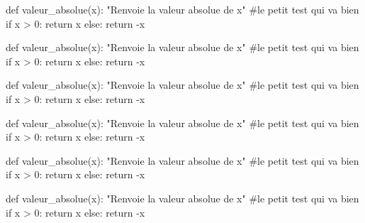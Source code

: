 \documentclass[french,a4paper,10pt]{article}
\begin{document}
\pagebreak

{\small \begin{codehigh}
\begin{CodePiton}[Style=Classique,Largeur=10cm,BarreTitre=false,Alignement=center]
def valeur_absolue(x):
    "Renvoie la valeur absolue de x"
    #le petit test qui va bien
    if x > 0:
        return x
    else:
    return -x
\end{CodePiton}
\end{codehigh}}

\begin{CodePiton}[Style=Classique,Largeur=10cm,BarreTitre=false,Alignement=center]
def valeur_absolue(x):
	"Renvoie la valeur absolue de x"
	#le petit test qui va bien
	if x > 0:
		return x
	else:
		return -x
\end{CodePiton}

{\small \begin{codehigh}
\begin{CodePiton}%
    [Style=Classique,Largeur=0.5\linewidth,Cadre=false,Alignement=flush right,Filigrane,Titre={Script}]
def valeur_absolue(x):
    "Renvoie la valeur absolue de x"
    #le petit test qui va bien
    if x > 0:
        return x
    else:
    return -x
\end{CodePiton}
\end{codehigh}}

\begin{CodePiton}[Style=Classique,Largeur=0.5\linewidth,Cadre=false,Alignement=flush right,Filigrane,Titre={Script}]
def valeur_absolue(x):
	"Renvoie la valeur absolue de x"
	#le petit test qui va bien
	if x > 0:
		return x
	else:
		return -x
\end{CodePiton}

{\small \begin{codehigh}
\begin{CodePiton}[Largeur=11cm,Filigrane,Alignement=flush left]
def valeur_absolue(x):
    "Renvoie la valeur absolue de x"
    #le petit test qui va bien
    if x > 0:
        return x
    else:
    return -x
\end{CodePiton}
\end{codehigh}}

\begin{CodePiton}[Largeur=11cm,Filigrane,Alignement=flush left]
def valeur_absolue(x):
	"Renvoie la valeur absolue de x"
	#le petit test qui va bien
	if x > 0:
		return x
	else:
		return -x
\end{CodePiton}
\end{document}
